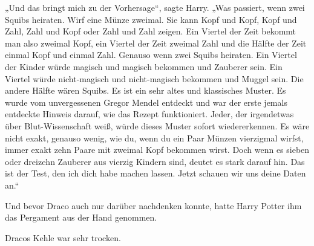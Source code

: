 „Und das bringt mich zu der Vorhersage“, sagte Harry. „Was passiert, wenn zwei Squibs heiraten. Wirf eine Münze zweimal. Sie kann Kopf und Kopf, Kopf und Zahl, Zahl und Kopf oder Zahl und Zahl zeigen. Ein Viertel der Zeit bekommt man also zweimal Kopf, ein Viertel der Zeit zweimal Zahl und die Hälfte der Zeit einmal Kopf und einmal Zahl. Genauso wenn zwei Squibs heiraten. Ein Viertel der Kinder würde magisch und magisch bekommen und Zauberer sein. Ein Viertel würde nicht-magisch und nicht-magisch bekommen und Muggel sein. Die andere Hälfte wären Squibs. Es ist ein sehr altes und klassisches Muster. Es wurde vom unvergessenen Gregor Mendel entdeckt und war der erste jemals entdeckte Hinweis darauf, wie das Rezept funktioniert. Jeder, der irgendetwas über Blut-Wissenschaft weiß, würde dieses Muster sofort wiedererkennen. Es wäre nicht exakt, genauso wenig, wie du, wenn du ein Paar Münzen vierzigmal wirfst, immer exakt zehn Paare mit zweimal Kopf bekommen wirst. Doch wenn es sieben oder dreizehn Zauberer aus vierzig Kindern sind, deutet es stark darauf hin. Das ist der Test, den ich dich habe machen lassen. Jetzt schauen wir uns deine Daten an.“

Und bevor Draco auch nur darüber nachdenken konnte, hatte Harry Potter ihm das Pergament aus der Hand genommen.

Dracos Kehle war sehr trocken.

